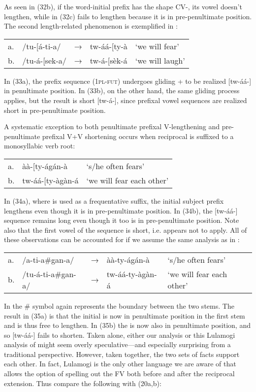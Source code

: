 \documentclass[output=paper,
modfonts
]{LSP/langsci}
\begin{document}
\noindent As seen in (32b), if the word-initial prefix has the shape CV-, its
vowel doesn't lengthen, while in (32c)  fails to lengthen because it
is in pre-penul\-ti\-mate position. The second length-related phenomenon is
exemplified in :

\ea \label{ex:hyman:33}\begin{tabular}[t]{@{}lllll}
a. & /tu-{[}á-ti-a/ &  → & tw-áá-{[}ty-à & `we will fear' \\
b. & /tu-á-{[}sek-a/ & → & tw-á-{[}sèk-á & `we will laugh'
\end{tabular}
\z

\noindent In (33a), the prefix sequence  (\textsc{1pl-fut}) undergoes
gliding +  to be realized {[}tw-áá-{]} in
penultimate position. In (33b), on the other hand, the same gliding
process applies, but the result is short {[}tw-á-{]}, since prefixal
vowel sequences are realized short in pre-penultimate position.

A systematic exception to both penultimate prefixal V-lengthening and
pre-penul\-ti\-mate prefixal V+V shortening occurs when reciprocal
 is suffixed to a monosyllabic verb root:

\ea\begin{tabular}[t]{@{}lll}
a. & àà-{[}ty-ágán-à & `s/he often fears' \\
b. & tw-áá-{[}ty-àgàn-á & `we will fear each other' \\
\end{tabular}
\z

\noindent In (34a), where  is used as a frequentative suffix, the
initial subject prefix  lengthens even though it is in
pre-penultimate position. In (34b), the {[}tw-áá-{]} sequence remains
long even though it too is in pre-penultimate position. Note also that
the first vowel of the  sequence is short, i.e.
 appears not to apply. All of these observations
can be accounted for if we assume the same analysis as in :

\ea \label{ex:hyman:35}\begin{tabular}[t]{@{}lllll@{}}
a. & /a-ti-a\#gan-a/ & → & àà-ty-ágán-à & `s/he often fears' \\
b. & /tu-á-ti-a\#gan-a/ & → & tw-áá-ty-àgàn-á & `we will fear each other'
\end{tabular}
\z

\noindent In  the \# symbol again represents the boundary between the two
stems. The result in (35a) is that the initial  is now in
penultimate position in the first stem and is thus free to lengthen. In
(35b) the  is now also in penultimate position, and so
{[}tw-áá-{]} fails to shorten. Taken alone, either our  analysis
or this Lulamogi analysis of \citet{hymaninpress} might seem overly
speculative---and especially surprising from a traditional 
perspective. However, taken together, the two sets of facts support each
other. In fact, Lulamogi is the only other  language we are aware
of that allows the option of spelling out the FV both before and after
the reciprocal extension. Thus compare the following with 
(20a,b):
\end{document}
